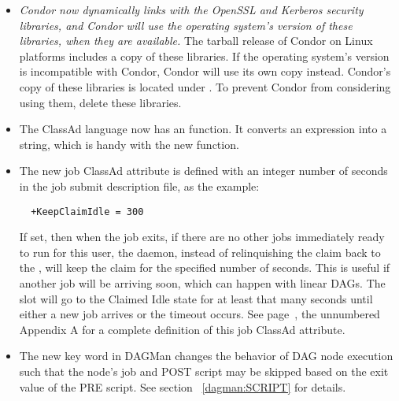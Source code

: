 \begin{itemize}

\item
\emph{Condor now dynamically links with the OpenSSL and Kerberos security
libraries, and Condor will use the operating system's version of these
libraries,  when they are available.} 
The tarball release of Condor on Linux platforms includes 
a copy of these libraries.  
If the operating system's version is incompatible with Condor, 
Condor will use its own copy instead.
Condor's copy of these libraries is located under .
To prevent Condor from considering using them, delete these libraries.

\item 
The ClassAd language now has an  function.  
It converts an expression into a string, 
which is handy with the new  function.

\item
The new job ClassAd attribute  is defined with an integer
number of seconds in the job submit description file, as the example:
\begin{verbatim}
  +KeepClaimIdle = 300
\end{verbatim}
If set, then when the job exits, 
if there are no other jobs immediately ready to run for this user, 
the  daemon,
instead of relinquishing the claim back to the , 
will keep the claim for the specified number of seconds.  
This is useful if another job will be arriving soon, 
which can happen with linear DAGs.  
The  slot
will go to the Claimed Idle state for at least that many seconds until
either a new job arrives or the timeout occurs.
See page~\pageref{sec:Job-ClassAd-Attributes},
the unnumbered Appendix A for a complete definition of this
job ClassAd attribute.

\item The new  key word in DAGMan changes the
behavior of DAG node execution such that the node's job and POST script
may be skipped based on the exit value of the PRE script.
See section ~\ref{dagman:SCRIPT} for details.


\end{itemize}

